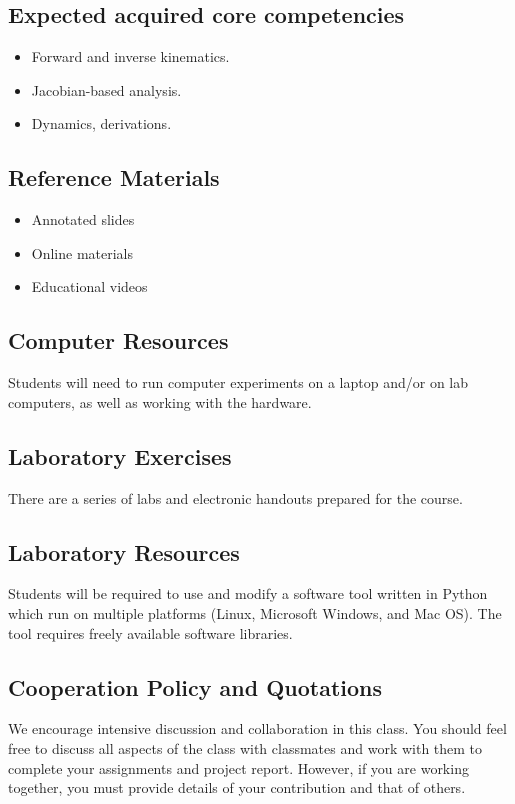 \subsection{Expected acquired core competencies}
 
\begin{itemize}
    \item Forward and inverse kinematics.
    \item Jacobian-based analysis.
    \item Dynamics, derivations.
\end{itemize} 

\subsection{Reference Materials}
\begin{itemize}
    \item Annotated slides
    \item Online materials
    \item Educational videos
\end{itemize}

\subsection{Computer Resources}
Students will need to run computer experiments on a laptop and/or on lab computers, as well as working with the hardware. 

\subsection{Laboratory Exercises} 
There are a series of labs and electronic handouts prepared for the course.

\subsection{Laboratory Resources}
Students will be required to use and modify a software tool written in Python which run on multiple platforms (Linux, Microsoft Windows, and Mac OS). The tool requires freely available software libraries.

\subsection{Cooperation Policy and Quotations}
We encourage intensive discussion and collaboration in this class. You should feel free to discuss all aspects of the class with classmates and work with them to complete your assignments and project report. However, if you are working together, you must provide details of your contribution and that of others.